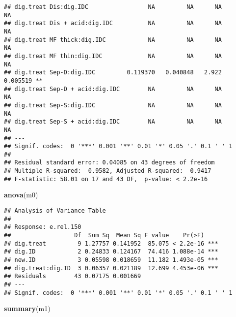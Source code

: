 \documentclass[
]{article}
\newenvironment{Shaded}{\begin{snugshade}}{\end{snugshade}}
\newcommand{\FunctionTok}[1]{\textcolor[rgb]{0.13,0.29,0.53}{\textbf{#1}}}
\newcommand{\NormalTok}[1]{#1}
\begin{document}
\begin{verbatim}
## dig.treat Dis:dig.IDC                 NA         NA      NA       NA    
## dig.treat Dis + acid:dig.IDC          NA         NA      NA       NA    
## dig.treat MF thick:dig.IDC            NA         NA      NA       NA    
## dig.treat MF thin:dig.IDC             NA         NA      NA       NA    
## dig.treat Sep-D:dig.IDC         0.119370   0.040848   2.922 0.005519 ** 
## dig.treat Sep-D + acid:dig.IDC        NA         NA      NA       NA    
## dig.treat Sep-S:dig.IDC               NA         NA      NA       NA    
## dig.treat Sep-S + acid:dig.IDC        NA         NA      NA       NA    
## ---
## Signif. codes:  0 '***' 0.001 '**' 0.01 '*' 0.05 '.' 0.1 ' ' 1
## 
## Residual standard error: 0.04085 on 43 degrees of freedom
## Multiple R-squared:  0.9582, Adjusted R-squared:  0.9417 
## F-statistic: 58.01 on 17 and 43 DF,  p-value: < 2.2e-16
\end{verbatim}

\begin{Shaded}
\begin{Highlighting}[]
\FunctionTok{anova}\NormalTok{(m0)}
\end{Highlighting}
\end{Shaded}

\begin{verbatim}
## Analysis of Variance Table
## 
## Response: e.rel.150
##                  Df  Sum Sq  Mean Sq F value    Pr(>F)    
## dig.treat         9 1.27757 0.141952  85.075 < 2.2e-16 ***
## dig.ID            2 0.24833 0.124167  74.416 1.088e-14 ***
## new.ID            3 0.05598 0.018659  11.182 1.493e-05 ***
## dig.treat:dig.ID  3 0.06357 0.021189  12.699 4.453e-06 ***
## Residuals        43 0.07175 0.001669                      
## ---
## Signif. codes:  0 '***' 0.001 '**' 0.01 '*' 0.05 '.' 0.1 ' ' 1
\end{verbatim}

\begin{Shaded}
\begin{Highlighting}[]
\FunctionTok{summary}\NormalTok{(m1)}
\end{Highlighting}
\end{Shaded}
\end{document}
